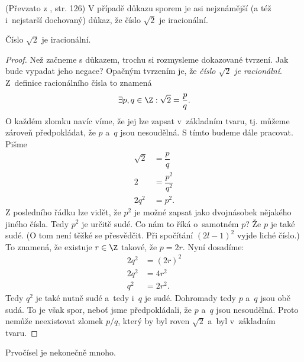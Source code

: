(Převzato z \cite{ChartrandPolimeniZhang2014}, str. 126)
V případě důkazu sporem je asi nejznámější (a též i~nejstarší dochovaný) důkaz, že číslo $\sqrt{2}$ je iracionální.
\begin{proposition}
    Číslo $\sqrt{2}$ je iracionální.
\end{proposition}
\begin{proof}
    Než začneme s důkazem, trochu si rozmysleme dokazované tvrzení. Jak bude vypadat jeho negace? Opačným tvrzením je, že \emph{číslo $\sqrt{2}$ je racionální}. Z~definice racionálního čísla to znamená
    \begin{equation*}
        \exists p,q\in\Z : \sqrt{2}=\dfrac{p}{q}.
    \end{equation*}
    O každém zlomku navíc víme, že jej lze zapsat v~základním tvaru, tj. můžeme zároveň předpokládat, že $p$ a~$q$ jsou nesoudělná. S tímto budeme dále pracovat. Pišme
    \begin{align*}
        \sqrt{2}&=\dfrac{p}{q}\\
        2&=\dfrac{p^2}{q^2}\\
        2q^2&=p^2.
    \end{align*}
    Z posledního řádku lze vidět, že $p^2$ je možné zapsat jako dvojnásobek nějakého jiného čísla. Tedy $p^2$ je určitě sudé. Co nám to říká o~samotném $p$? Že $p$ je také sudé. (O tom není těžké se přesvědčit. Při spočítání $(2l-1)^2$ vyjde liché číslo.) To znamená, že existuje $r\in\Z$ takové, že $p=2r$. Nyní dosadíme:
    \begin{align*}
        2q^2&=(2r)^2\\
        2q^2&=4r^2\\
        q^2&=2r^2.
    \end{align*}
    Tedy $q^2$ je také nutně sudé a~tedy i~$q$ je sudé. Dohromady tedy $p$ a~$q$ jsou obě sudá. To je však spor, neboť jsme předpokládali, že $p$ a~$q$ jsou nesoudělná. Proto nemůže neexistovat zlomek $p/q$, který by byl roven $\sqrt{2}$ a~byl v~základním tvaru.
\end{proof}
\begin{proposition}\label{prop:prvocisla}
    Prvočísel je nekonečně mnoho.
\end{proposition}
